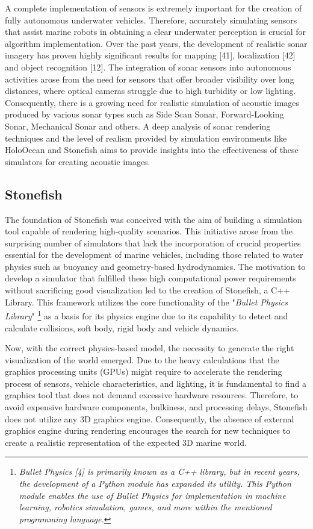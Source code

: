 \documentclass[]{article}
\begin{document}
	A complete implementation of sensors is extremely important for the creation of fully autonomous underwater vehicles. Therefore, accurately simulating sensors that assist marine robots in obtaining a clear underwater perception is crucial for algorithm implementation. Over the past years, the development of realistic sonar imagery has proven highly significant results for mapping [41], localization [42] and object recognition [12]. The integration of sonar sensors into autonomous activities arose from the need for sensors that offer broader visibility over long distances, where optical cameras struggle due to high turbidity or low lighting. Consequently, there is a growing need for realistic simulation of acoustic images produced by various sonar types such as Side Scan Sonar, Forward-Looking Sonar, Mechanical Sonar and others. A deep analysis of sonar rendering techniques and the level of realism provided by simulation environments like HoloOcean and Stonefish aims to provide insights into the effectiveness of these simulators for creating acoustic images.
	
	
	
	
	\subsection{Stonefish}
	
	The foundation of Stonefish was conceived with the aim of building a simulation tool capable of rendering high-quality scenarios. This initiative arose from the surprising number of simulators that lack the incorporation of crucial properties essential for the development of marine vehicles, including those related to water physics such as buoyancy and geometry-based hydrodynamics. The motivation to develop a simulator that fulfilled these high computational power requirements without sacrificing good visualization led to the creation of Stonefish, a C++ Library. This framework utilizes the core functionality of the "\textit{Bullet Physics Library}" \footnote[3]{\textit{Bullet Physics [4] is primarily known as a C++ library, but in recent years, the development of a Python module has expanded its utility. This Python module enables the use of Bullet Physics for implementation in machine learning, robotics simulation, games, and more within the mentioned programming language.}} as a basis for its physics engine due to its capability to detect and calculate collisions, soft body, rigid body and vehicle dynamics. 
	
	Now, with the correct physics-based model, the necessity to generate the right visualization of the world emerged. Due to the heavy calculations that the graphics processing units (GPUs) might require to accelerate the rendering process of sensors, vehicle characteristics, and lighting, it is fundamental to find a graphics tool that does not demand excessive hardware resources. Therefore, to avoid expensive hardware components, bulkiness, and processing delays, Stonefish does not utilize any 3D graphics engine. Consequently, the absence of external graphics engine during rendering encourages the search for new techniques to create a realistic representation of the expected 3D marine world. 
	
\end{document}

